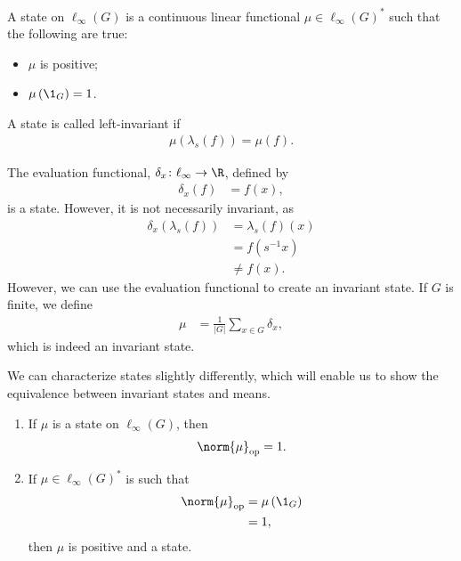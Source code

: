 \begin{definition}
  A {state} on $\ell_{\infty}\left(G\right)$ is a continuous linear functional $\mu\in \ell_{\infty}\left(G\right)^{\ast}$ such that the following are true:
  \begin{itemize}
    \item $\mu$ is positive;
    \item $\mu\left(\1_{G}\right) = 1$.
  \end{itemize}
  A state is called left-invariant if
  \begin{align*}
    \mu\left(\lambda_s\left(f\right)\right) = \mu\left(f\right).
  \end{align*}
\end{definition}
\begin{example}\label{ex:finite_invariant_state}
  The evaluation functional, $\delta_x\colon \ell_{\infty}\rightarrow \R$, defined by
  \begin{align*}
    \delta_{x}\left(f\right) &= f(x),
  \end{align*}
  is a state. However, it is not necessarily invariant, as
  \begin{align*}
    \delta_x\left(\lambda_s\left(f\right)\right) &= \lambda_s\left(f\right)\left(x\right)\\
                                                 &= f\left(s^{-1}x\right)\\
                                                 &\neq f(x).
  \end{align*}
  However, we can use the evaluation functional to create an invariant state. If $G$ is finite, we define
  \begin{align*}
    \mu &= \frac{1}{\left\vert G \right\vert} \sum_{x\in G}\delta_x,
  \end{align*}
  which is indeed an invariant state.
\end{example}
We can characterize states slightly differently, which will enable us to show the equivalence between invariant states and means.
\begin{lemma}\label{lemma:characterizing_states}\hfill
  \begin{enumerate}[(1)]
    \item If $\mu$ is a state on $\ell_{\infty}\left(G\right)$, then
      \begin{align*}
        \norm{\mu}_{\op} = 1.
      \end{align*}
    \item If $\mu\in \ell_{\infty}\left(G\right)^{\ast}$ is such that
      \begin{align*}
        \norm{\mu}_{\op} &= \mu\left(\1_{G}\right)\\
                               &= 1,
      \end{align*}
      then $\mu$ is positive and a state.
  \end{enumerate}
\end{lemma}
